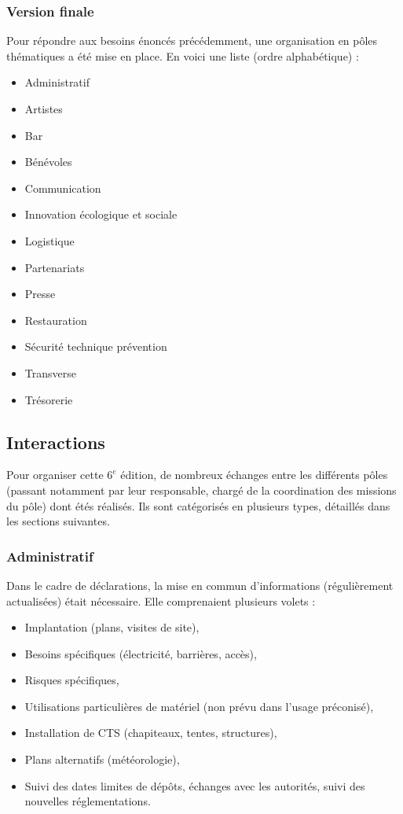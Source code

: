 \documentclass[12pt,a4paper]{report}
\begin{document}
\subsubsection{Version finale}
Pour répondre aux besoins énoncés précédemment, une organisation en pôles thématiques a été mise en place. En voici une liste (ordre alphabétique) : 
\begin{itemize}
\item Administratif
\item Artistes
\item Bar
\item Bénévoles
\item Communication
\item Innovation écologique et sociale
\item Logistique
\item Partenariats
\item Presse
\item Restauration
\item Sécurité technique prévention
\item Transverse
\item Trésorerie
\end{itemize}

\subsection{Interactions}
Pour organiser cette $6^e$ édition, de nombreux échanges entre les différents pôles (passant notamment par leur responsable, chargé de la coordination des missions du pôle) dont étés réalisés. Ils sont catégorisés en plusieurs types, détaillés dans les sections suivantes.

\subsubsection{Administratif}
Dans le cadre de déclarations, la mise en commun d'informations (régulièrement actualisées) était nécessaire. Elle comprenaient plusieurs volets :
\begin{itemize}
\item Implantation (plans, visites de site),
\item Besoins spécifiques (électricité, barrières, accès),
\item Risques spécifiques,
\item Utilisations particulières de matériel (non prévu dans l'usage préconisé),
\item Installation de CTS (chapiteaux, tentes, structures),
\item Plans alternatifs (météorologie),
\item Suivi des dates limites de dépôts, échanges avec les autorités, suivi des nouvelles réglementations.
\end{itemize}
\end{document}
